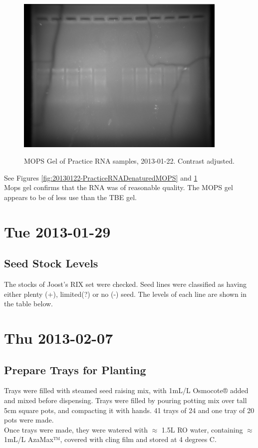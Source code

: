 \documentclass[12pt,a4paper]{book}
\begin{document}
      \begin{figure}[h!]
        \caption{MOPS Gel of Practice RNA samples, 2013-01-22. Contrast adjusted.}
        \centering
          \includegraphics[width=0.9\textwidth]{./2013-01/20130122-PracticeRNADenaturedMOPS-HighContrast}
        \label{fig:20130122-PracticeRNADenaturedMOPS-HighContrast}
      \end{figure}

      See Figures \ref{fig:20130122-PracticeRNADenaturedMOPS} and
      \ref{fig:20130122-PracticeRNADenaturedMOPS-HighContrast}\\
      Mops gel confirms that the RNA was of reasonable quality. The MOPS gel appears to be of less use than the TBE
      gel.\\

\chapter*{Tue 2013-01-29}
  \section*{Seed Stock Levels}
    The stocks of Joost's RIX set were checked. Seed lines were classified as having either plenty
    (+), limited(?) or no (-) seed. The levels of each line are shown in the table below.

\chapter*{Thu 2013-02-07}
  \section*{Prepare Trays for Planting}
    Trays were filled with steamed seed raising mix, with 1mL/L Osmocote® added and mixed before
    dispensing. Trays were filled by pouring potting mix over tall 5cm square pots, and compacting
    it with hands. 41 trays of 24 and one tray of 20 pots were made.\\
    Once trays were made, they were watered with $\approx$ 1.5L RO water, containing $\approx$ 1mL/L
    AzaMax™, covered with cling film and stored at 4 degrees C.
\end{document}
